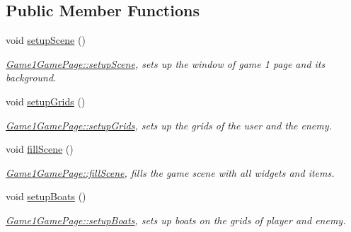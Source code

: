 \subsection*{Public Member Functions}
\begin{DoxyCompactItemize}
\item 
\mbox{\label{classGame1GamePage_afaad60ba08c49a7aec3aef5fadb6588c}} 
void \hyperlink{classGame1GamePage_afaad60ba08c49a7aec3aef5fadb6588c}{setup\+Scene} ()
\begin{DoxyCompactList}\small\item\em \hyperlink{classGame1GamePage_afaad60ba08c49a7aec3aef5fadb6588c}{Game1\+Game\+Page\+::setup\+Scene}, sets up the window of game 1 page and its background. \end{DoxyCompactList}\item 
\mbox{\label{classGame1GamePage_a7883c5c3eb225ee14e662b8fb73bca69}} 
void \hyperlink{classGame1GamePage_a7883c5c3eb225ee14e662b8fb73bca69}{setup\+Grids} ()
\begin{DoxyCompactList}\small\item\em \hyperlink{classGame1GamePage_a7883c5c3eb225ee14e662b8fb73bca69}{Game1\+Game\+Page\+::setup\+Grids}, sets up the grids of the user and the enemy. \end{DoxyCompactList}\item 
\mbox{\label{classGame1GamePage_aa03791d5d0134726886da82236e1fd55}} 
void \hyperlink{classGame1GamePage_aa03791d5d0134726886da82236e1fd55}{fill\+Scene} ()
\begin{DoxyCompactList}\small\item\em \hyperlink{classGame1GamePage_aa03791d5d0134726886da82236e1fd55}{Game1\+Game\+Page\+::fill\+Scene}, fills the game scene with all widgets and items. \end{DoxyCompactList}\item 
\mbox{\label{classGame1GamePage_ac96dac26541e8e4cffa130d4ceea5117}} 
void \hyperlink{classGame1GamePage_ac96dac26541e8e4cffa130d4ceea5117}{setup\+Boats} ()
\begin{DoxyCompactList}\small\item\em \hyperlink{classGame1GamePage_ac96dac26541e8e4cffa130d4ceea5117}{Game1\+Game\+Page\+::setup\+Boats}, sets up boats on the grids of player and enemy. \end{DoxyCompactList}\item 

\end{DoxyCompactItemize}
